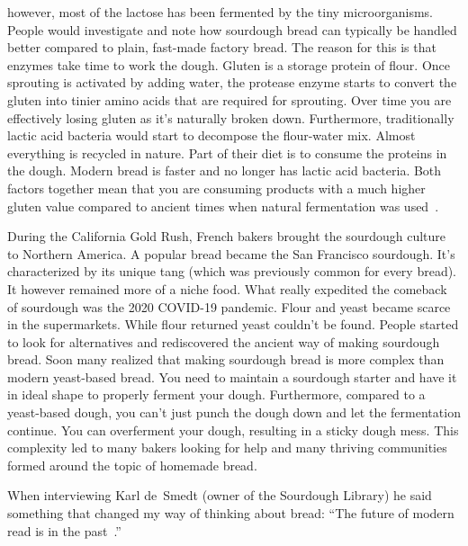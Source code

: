however, most of the lactose has been fermented by
the tiny microorganisms. People would investigate and
note how sourdough bread can typically be handled better
compared to plain, fast-made factory bread. The
reason for this is that enzymes take time to work the dough.
Gluten is a storage protein of flour. Once
sprouting is activated by adding water, the protease
enzyme starts to convert the gluten into tinier amino acids
that are required for sprouting. Over time you are effectively
losing gluten as it's naturally broken down. Furthermore,
traditionally lactic acid bacteria would start to decompose
the flour-water mix. Almost everything is recycled in nature.
Part of their diet is to consume the proteins in the dough.
Modern bread is faster and no longer has lactic acid bacteria.
Both factors together mean that you are consuming products
with a much higher gluten value compared to ancient times
when natural fermentation was used~\cite{raffaella+di+cagno}.

During the California Gold Rush, French bakers brought the sourdough
culture to Northern America. A popular bread became the
San Francisco sourdough. It's characterized by its unique
tang (which was previously common for every bread). It
however remained more of a niche food. What really expedited
the comeback of sourdough was the 2020 COVID-19 pandemic.
Flour and yeast became scarce in the supermarkets. While
flour returned yeast couldn't be found. People started
to look for alternatives and rediscovered the ancient
way of making sourdough bread. Soon many realized
that making sourdough bread is more complex than modern
yeast-based bread. You need to maintain a sourdough starter
and have it in ideal shape to properly ferment your dough.
Furthermore, compared to a yeast-based dough, you can't just
punch the dough down and let the fermentation continue.
You can overferment your dough, resulting in a sticky
dough mess. This complexity led to many bakers looking
for help and many thriving communities formed around
the topic of homemade bread.

When interviewing Karl de~Smedt (owner of the Sourdough
Library) he said something that changed my way of thinking
about bread: ``The future of
modern  read is in the past~\cite{interview+karl+de+smedt}.''
